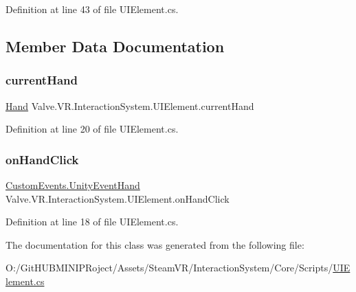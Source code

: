 Definition at line 43 of file U\+I\+Element.\+cs.



\subsection{Member Data Documentation}
\mbox{\label{class_valve_1_1_v_r_1_1_interaction_system_1_1_u_i_element_ae9b3f4e376147d62b135e0854f3f5c2b}} 
\subsubsection{\texorpdfstring{currentHand}{currentHand}}
{\footnotesize\ttfamily \mbox{\hyperlink{class_valve_1_1_v_r_1_1_interaction_system_1_1_hand}{Hand}} Valve.\+V\+R.\+Interaction\+System.\+U\+I\+Element.\+current\+Hand\hspace{0.3cm}{\ttfamily [protected]}}



Definition at line 20 of file U\+I\+Element.\+cs.

\mbox{\label{class_valve_1_1_v_r_1_1_interaction_system_1_1_u_i_element_a751b43bce40762d303a7c32da3f7e2a8}} 
\subsubsection{\texorpdfstring{onHandClick}{onHandClick}}
{\footnotesize\ttfamily \mbox{\hyperlink{class_valve_1_1_v_r_1_1_interaction_system_1_1_custom_events_1_1_unity_event_hand}{Custom\+Events.\+Unity\+Event\+Hand}} Valve.\+V\+R.\+Interaction\+System.\+U\+I\+Element.\+on\+Hand\+Click}



Definition at line 18 of file U\+I\+Element.\+cs.



The documentation for this class was generated from the following file\+:\begin{DoxyCompactItemize}
\item 
O\+:/\+Git\+H\+U\+B\+M\+I\+N\+I\+P\+Roject/\+Assets/\+Steam\+V\+R/\+Interaction\+System/\+Core/\+Scripts/\mbox{\hyperlink{_u_i_element_8cs}{U\+I\+Element.\+cs}}\end{DoxyCompactItemize}
